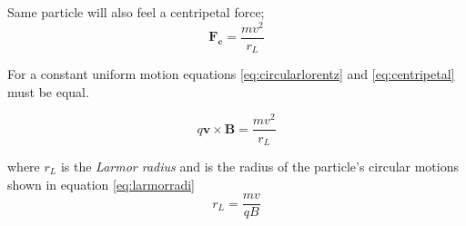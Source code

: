 Same particle will also feel a centripetal force;
\begin{equation}
    \mathbf{F_c} = \frac{mv^2}{r_L}
    \label{eq:centripetal}
\end{equation}

For a constant uniform motion equations \ref{eq:circularlorentz} and \ref{eq:centripetal} must be equal.

\begin{equation}
    q\mathbf{v} \times \mathbf{B} = \frac{mv^2}{r_L}
    \label{eq:larmor}
\end{equation}

where $r_L$ is the \textit{Larmor radius} and is the radius of the particle's circular motions shown in equation \ref{eq:larmorradi}
\begin{equation}
    r_L = \dfrac{mv}{qB}
    \label{eq:larmorradi}
\end{equation}












